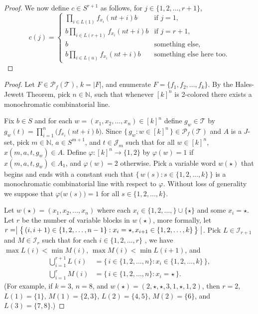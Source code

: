 \documentclass[12pt]{article}
\theoremstyle{plain}
\theoremstyle{definition}
\newcommand{\bbN}{\mathbb{N}}
\newcommand{\calI}{\mathcal{I}}
\newcommand{\calJ}{\mathcal{J}}
\newcommand{\calT}{\mathcal{T}}
\newcommand{\Pf}{\mathcal{P}_f}
\begin{document}
\begin{proof}
  We now define $c \in S^{r+1}$ as follows, for $j \in \{1, 2, \ldots, r+1\}$,
  \[
    c(j) = 
    \begin{cases}
      \prod_{i \in L(1)} f_{x_i}(nt + i)b & \mbox{if $j = 1$,} \\
      b\prod_{i \in L(r+1)} f_{x_i}(nt + i)b & \mbox{if $j = r+1$,} \\
      b & \mbox{something else,} \\
      b\prod_{i \in L(u)} f_{x_i}(nt+i)b & \mbox{something else here too.}
    \end{cases}
  \]
\end{proof}
\begin{proof}
  Let $F \in \Pf(\calT)$, $k = |F|$, and enumerate $F = \{ f_1, f_2,
  \ldots, f_k \}$. 
  By the Hales-Jewett Theorem, pick $n \in \bbN$, such that whenever
  $[k]^n$ is 2-colored there exists a monochromatic combinatorial
  line.
  
  Fix $b \in S$ and for each $w = (x_1, x_2, \ldots, x_n) \in [k]^n$
  define $g_w \in \calT$ by $g_w(t) = \prod_{i=1}^n
  \bigr(f_{x_i}(nt+i)b\bigr)$.
  Since $\{\, g_w : w \in [k]^n \,\} \in \Pf(\calT)$ and $A$ is a
  $J$-set, pick $m \in \bbN$, $a \in S^{m+1}$, and $t \in \calJ_m$
  such that for all $w \in [k]^n$, $x(m, a, t, g_w) \in A$.
  Define $\varphi \colon [k]^n \to \{1, 2\}$ by $\varphi(w) = 1 $ if
  $x(m, a, t, g_w) \in A_1$, and $\varphi(w) = 2$ otherwise.
  Pick a variable word $w(\star)$ that begins and ends with a constant
  such that $\bigl\{\, w(s) : s \in
  \{1, 2, \ldots, k\} \,\bigr\}$ is a monochromatic combinatorial line
  with respect to $\varphi$.
  Without loss of generality we suppose that $\varphi\bigl(w(s)\bigr)
  = 1$ for all $s \in \{1, 2, \ldots, k\}$. 

  Let $w(\star) = (x_1, x_2, \ldots, x_n)$ where each $x_i \in \{1, 2,
  \ldots, \} \cup \{\star\}$ and some $x_i = \star$. 
  Let $r$ be the number of variable blocks in $w(\star)$, more
  formally, let $r = \bigm|\bigl\{\, (i, i+1) \in \{1, 2, \ldots, n-1\} :
  x_i = \star, x_{i+1} \in \{1, 2, \ldots, k\} \,\bigr\}\bigm|$.
  Pick $L \in \calI_{r+1}$ and $M \in \calI_r$ such that for each $i
  \in \{1, 2, \ldots, r\}$ , we have $\max L(i) < \min M(i)$, $\max
  M(i) < \min L(i+1)$, and 
  \begin{align*}
    \bigcup_{i=1}^{r+1} L(i) &= \bigl\{\, i \in \{1, 2, \ldots, n \} :
    x_i \in \{1, 2, \ldots, k\} \,\bigr\}, \\
    \bigcup_{i=1}^r M(i) &= \bigl\{\, i \in \{1, 2, \ldots, n \} : x_i
    = \star \,\bigr\}.
  \end{align*}
  (For example, if $k = 3$, $n = 8$, and $w(\star) = (2, \star, \star,
  3, 1, \star, 1, 2)$, then $r = 2$, $L(1) = \{1\}$, $M(1) = \{2,
  3\}$, $L(2) = \{4, 5\}$, $M(2) = \{6\}$, and $L(3) = \{7, 8\}$.)
  

\end{proof}
\end{document}
